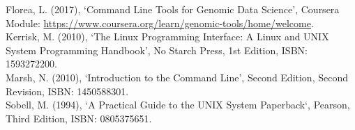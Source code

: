 \documentclass[11pt]{article}
\begin{document}
\noindent
Florea, L. (2017), `Command Line Tools for Genomic Data Science', Coursera Module: \url{https://www.coursera.org/learn/genomic-tools/home/welcome}.\\

\noindent
Kerrisk, M. (2010), `The Linux Programming Interface: A Linux and UNIX System Programming Handbook', No Starch Press, 1st Edition, ISBN: 1593272200. \\

\noindent
Marsh, N. (2010), `Introduction to the Command Line', Second Edition, Second Revision, ISBN: 1450588301.\\

\noindent
Sobell, M. (1994), `A Practical Guide to the UNIX System Paperback`, Pearson, Third Edition,  ISBN: 0805375651.\\
\end{document}
